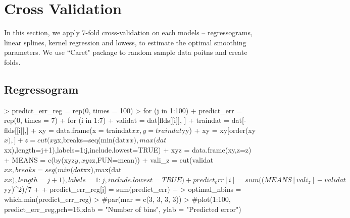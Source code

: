 \documentclass[12pt]{article}
\begin{document}
\section{Cross Validation}
In this section, we apply 7-fold cross-validation on each models -- regressograms, linear splines, kernel regression and lowess, to estimate the optimal smoothing parameters. We use ``Caret" package to random sample data poitns and create folds.

\subsection{Regressogram}
\begin{Schunk}
\begin{Sinput}
> predict_err_reg = rep(0, times = 100)
> for (j in 1:100){
+   predict_err = rep(0, times = 7)
+   for (i in 1:7){
+     validat = dat[flds[[i]], ]
+     traindat = dat[-flds[[i]],]
+     xy = data.frame(x = traindat$xx, y = traindat$yy)
+     xy = xy[order(xy$x),]
+     z = cut(xy$x,breaks=seq(min(dat$xx),max(dat$xx),length=j+1),labels=1:j,include.lowest=TRUE)
+     xyz = data.frame(xy,z=z)
+     MEANS = c(by(xyz$y,xyz$z,FUN=mean))
+     vali_z = cut(validat$xx,breaks=seq(min(dat$xx),max(dat$xx),length=j+1),labels=1:j,include.lowest=TRUE)
+     predict_err[i] = sum((MEANS[vali_z]-validat$yy)^2)/7
+   }
+   predict_err_reg[j] = sum(predict_err)
+ }
> optimal_nbins = which.min(predict_err_reg)
> #par(mar = c(3, 3, 3, 3)) 
> #plot(1:100, predict_err_reg,pch=16,xlab = "Number of bins", ylab = "Predicted error")
\end{Sinput}
\end{Schunk}
\end{document}
